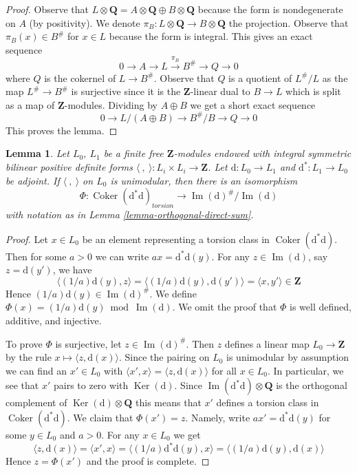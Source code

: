 \documentclass{stacks-project}
\theoremstyle{plain}
\newtheorem{lemma}[subsection]{Lemma}
\theoremstyle{definition}
\theoremstyle{remark}
\numberwithin{equation}{subsection}
\def\Ker{\mathop{\mathrm{Ker}}}
\def\Im{\mathop{\mathrm{Im}}}
\def\Coker{\mathop{\mathrm{Coker}}}
\begin{document}
\begin{proof}
Observe that
$L \otimes \mathbf{Q} = A \otimes \mathbf{Q} \oplus B \otimes \mathbf{Q}$
because the form is nondegenerate on $A$ (by positivity).
We denote $\pi_B : L \otimes \mathbf{Q} \to B \otimes \mathbf{Q}$
the projection. Observe that $\pi_B(x) \in B^\#$ for $x \in L$
because the form is integral. This gives an exact sequence
$$
0 \to A \to L \xrightarrow{\pi_B} B^\# \to Q \to 0
$$
where $Q$ is the cokernel of $L \to B^\#$. Observe that $Q$
is a quotient of $L^\#/L$ as the map $L^\# \to B^\#$ is surjective
since it is the $\mathbf{Z}$-linear dual to $B \to L$ which is split
as a map of $\mathbf{Z}$-modules.
Dividing by $A \oplus B$ we get a short exact sequence
$$
0 \to L/(A \oplus B) \to B^\#/B \to Q \to 0
$$
This proves the lemma.
\end{proof}

\begin{lemma}
\label{lemma-coker}
Let $L_0$, $L_1$ be a finite free $\mathbf{Z}$-modules endowed
with integral symmetric bilinear positive definite
forms $\langle\ ,\ \rangle : L_i \times L_i \to \mathbf{Z}$.
Let $\text{d} : L_0 \to L_1$ and $\text{d}^* : L_1 \to L_0$
be adjoint. If $\langle\ ,\ \rangle$ on $L_0$ is unimodular, then
there is an isomorphism
$$
\Phi :
\Coker(\text{d}^*\text{d})_{torsion}
\longrightarrow
\Im(\text{d})^\#/\Im(\text{d})
$$
with notation as in Lemma \ref{lemma-orthogonal-direct-sum}.
\end{lemma}

\begin{proof}
Let $x \in L_0$ be an element representing a torsion
class in $\Coker(\text{d}^*\text{d})$.
Then for some $a > 0$ we can write $ax = \text{d}^*\text{d}(y)$.
For any $z \in \Im(\text{d})$, say $z = \text{d}(y')$, we have
$$
\langle (1/a)\text{d}(y), z \rangle =
\langle (1/a)\text{d}(y), \text{d}(y') \rangle =
\langle x, y' \rangle \in \mathbf{Z}
$$
Hence $(1/a)\text{d}(y) \in \Im(\text{d})^\#$. We define
$\Phi(x) = (1/a)\text{d}(y) \bmod \Im(\text{d})$.
We omit the proof that $\Phi$ is well defined, additive, and injective.

\medskip\noindent
To prove $\Phi$ is surjective, let $z \in \Im(\text{d})^\#$.
Then $z$ defines a linear map $L_0 \to \mathbf{Z}$
by the rule $x \mapsto \langle z, \text{d}(x)\rangle$.
Since the pairing on $L_0$ is unimodular by assumption
we can find an $x' \in L_0$ with
$\langle x', x \rangle = \langle z, \text{d}(x)\rangle$
for all $x \in L_0$. In particular, we see
that $x'$ pairs to zero with $\Ker(\text{d})$.
Since $\Im(\text{d}^*\text{d}) \otimes \mathbf{Q}$
is the orthogonal complement of $\Ker(\text{d}) \otimes \mathbf{Q}$
this means that $x'$ defines a torsion class in
$\Coker(\text{d}^*\text{d})$. We claim that $\Phi(x') = z$.
Namely, write $a x' = \text{d}^*\text{d}(y)$
for some $y \in L_0$ and $a > 0$.
For any $x \in L_0$ we get
$$
\langle z, \text{d}(x)\rangle =
\langle x', x \rangle =
\langle (1/a)\text{d}^*\text{d}(y), x \rangle =
\langle (1/a)\text{d}(y),\text{d}(x) \rangle
$$
Hence $z = \Phi(x')$ and the proof is complete.
\end{proof}
\end{document}
